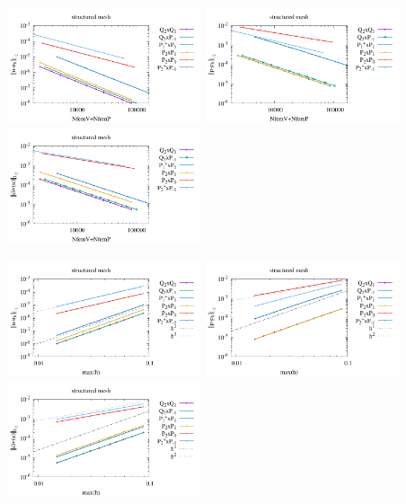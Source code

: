 \begin{center}
\includegraphics[width=5.7cm]{python_codes/fieldstone_120/paperresults/dh_structured_errorsV2.pdf}
\includegraphics[width=5.7cm]{python_codes/fieldstone_120/paperresults/dh_structured_errorsP2.pdf}
\includegraphics[width=5.7cm]{python_codes/fieldstone_120/paperresults/dh_structured_errors_divv2.pdf}\\
\end{center}

\begin{center}
\includegraphics[width=5.7cm]{python_codes/fieldstone_120/paperresults/dh_structured_errorsV3.pdf}
\includegraphics[width=5.7cm]{python_codes/fieldstone_120/paperresults/dh_structured_errorsP3.pdf}
\includegraphics[width=5.7cm]{python_codes/fieldstone_120/paperresults/dh_structured_errors_divv3.pdf}\\
\end{center}

